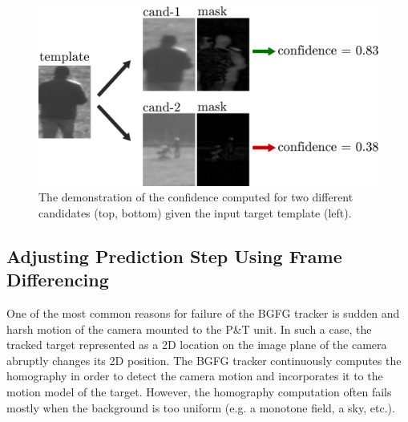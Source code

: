\begin{figure}[htb]
	\centering
	\includegraphics[width=0.5\linewidth]{fig/confidence.pdf}
	\caption{The demonstration of the confidence computed for two different candidates (top, bottom) given the input target template (left).}
	\label{fig:confidence}
\end{figure}

\subsection{Adjusting Prediction Step Using Frame Differencing} \label{txt:adjusting_prediction_step}

One of the most common reasons for failure of the BGFG tracker is sudden and harsh motion of the camera mounted to the P\&T unit. In such a case, the tracked target represented as a 2D location on the image plane of the camera abruptly changes its 2D position. The BGFG tracker continuously computes the homography \cite{ObjectTrackinginMonochromaticVideo} in order to detect the camera motion and incorporates it to the motion model of the target. However, the homography computation often fails mostly when the background is too uniform (e.g. a monotone field, a sky, etc.).

